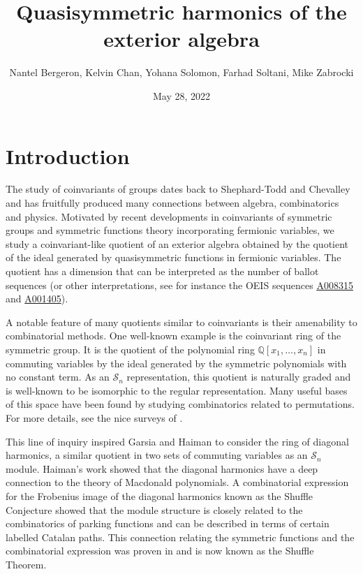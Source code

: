 \documentclass[11pt,oneside]{amsart}
\title{Quasisymmetric harmonics of the exterior algebra}
\author{Nantel Bergeron,
Kelvin Chan,
Yohana Solomon,
Farhad Soltani,
Mike Zabrocki}
\date{May 28, 2022}
\theoremstyle{definition}
\numberwithin{equation}{section}
\begin{document}
\maketitle

\section{Introduction}
The study of coinvariants of groups dates back to Shephard-Todd and Chevalley~\cite{ST,Chevalley} and has fruitfully produced many connections between algebra, combinatorics and physics.  Motivated by recent developments in coinvariants of symmetric groups and symmetric functions theory incorporating fermionic variables, we study a coinvariant-like quotient of an exterior algebra obtained by the quotient of the ideal generated by quasisymmetric functions in fermionic variables.  The quotient has a dimension that can be interpreted as the number of ballot sequences (or other interpretations, see for instance the OEIS \cite{OEIS} sequences \href{https://oeis.org/A008315}{A008315} and \href{https://oeis.org/A001405}{A001405}).

A notable feature of many quotients similar to coinvariants is their amenability to combinatorial methods.  One well-known example is the coinvariant ring of the symmetric group.  It is the quotient of the polynomial ring $\mathbb{Q}[x_{1},\dots,x_{n}]$ in commuting variables by the ideal generated by the symmetric polynomials with no constant term.  As an $\mathcal{S}_{n}$ representation, this quotient is naturally graded and is well-known to be isomorphic to the regular representation.  Many useful bases of this space have been found by studying combinatorics related to permutations.  For more details, see the nice surveys of \cite{B, GH, MacSchub, Manivel}.

This line of inquiry inspired Garsia and Haiman \cite{GH96,H} to consider the ring of diagonal harmonics, a similar quotient in two sets of commuting variables as an $\mathcal{S}_{n}$ module.  Haiman's work \cite{H2} showed that the diagonal harmonics have a deep connection to the theory of Macdonald polynomials.  A combinatorial expression for the Frobenius image of the diagonal harmonics known as the Shuffle Conjecture \cite{HHLRU} showed that the module structure is closely related to the combinatorics of parking functions and can be described in terms of certain labelled Catalan paths.  This connection relating the symmetric functions and the combinatorial expression was proven in \cite{CM} and is now known as the Shuffle Theorem.
\end{document}
